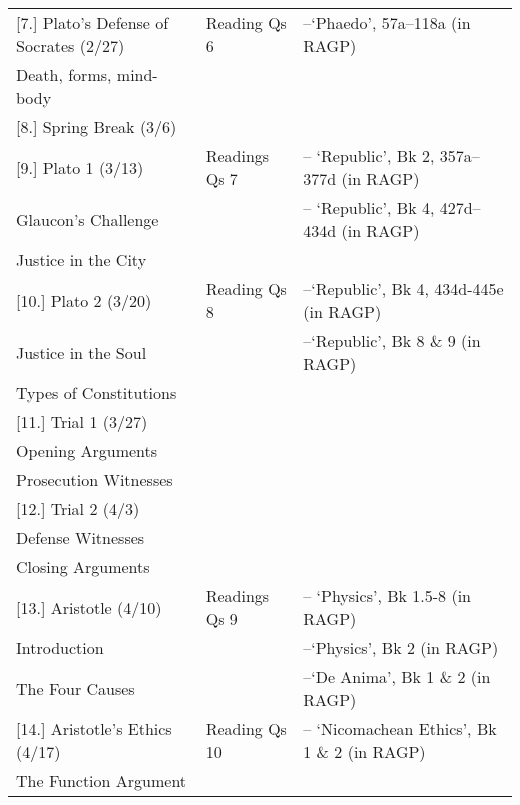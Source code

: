 \documentclass[article,oneside]{memoir}
\begin{document}
\begin{landscape}
\begin{center}
\begin{longtable}{p{8cm}p{4cm}p{8cm}}
[7.] Plato's Defense of Socrates (2/27)		& Reading Qs 6				& --`Phaedo', 57a--118a (in RAGP)	 \\
Death, forms, mind-body					                                  & 							&  \\ [1\baselineskip]  \midrule

	
[8.] Spring Break (3/6)		 			& 				    	 &  \\ [1\baselineskip]  \midrule
  

							
[9.] Plato 1 (3/13)					& Readings Qs	7		& -- `Republic', Bk 2, 357a--377d (in RAGP)  \\ 
Glaucon's Challenge					& 	 				& -- `Republic', Bk 4, 427d--434d (in RAGP) \\ 
Justice in the City 					&					&    	\\ [1\baselineskip] \midrule

[10.] Plato 2 (3/20)					& Reading Qs 8				& --`Republic', Bk 4, 434d-445e (in RAGP) \\
Justice in the Soul	         			& 					& --`Republic', Bk 8 \& 9 (in RAGP)   \\  
Types of Constitutions                    		& 					&   \\ [1\baselineskip] \midrule
	

[11.] Trial 1 (3/27)					&  				&  \\
Opening Arguments				 	&  				&  \\  
Prosecution Witnesses			 	&  				&  \\  [1\baselineskip] \midrule

                            

[12.] Trial 2  (4/3)					&             		  	&  \\ 
Defense Witnesses			    		& 				&  \\ 
Closing Arguments					&  				&  \\  [1\baselineskip] \midrule


							
							
[13.] Aristotle (4/10)					& Readings Qs 9 		& -- `Physics',  Bk 1.5-8 (in RAGP)  \\ %
Introduction						&					& --`Physics', Bk 2 (in RAGP) \\ 				
The Four Causes					&					& --`De Anima', Bk 1 \& 2 (in RAGP) \\ [1\baselineskip] \midrule
			


[14.] Aristotle's Ethics (4/17)			& Reading Qs 10 				& -- `Nicomachean Ethics', Bk 1 \& 2 (in RAGP) \\
The Function Argument				&					& 	 \\ [\baselineskip] \midrule



\end{longtable}
\end{center}
\end{landscape}
\end{document}
